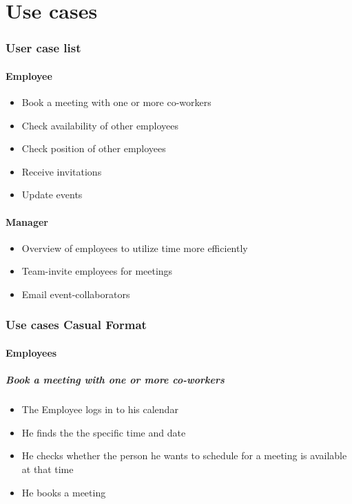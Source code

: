 \documentclass[10pt]{article}
\begin{document}
\part{Use cases}

\section{User case list}

\subsection{Employee}

\begin{itemize}
\item Book a meeting with one or more co-workers
\item Check availability of other employees
\item Check position of other employees
\item Receive invitations
\item Update events 
\end{itemize}


\subsection{Manager}
\begin{itemize}
\item Overview of employees to utilize time more efficiently
\item Team-invite employees for meetings
\item Email event-collaborators
\end{itemize}

\section{Use cases Casual Format}

\subsection{Employees}

\subsubsection{Book a meeting with one or more co-workers}

\begin{itemize}
\item The Employee logs in to his calendar 
\item He finds the the specific time and date 
\item He checks whether the person he wants to schedule for a meeting is available at that time 
\item He books a meeting
\end{itemize}
\end{document}
